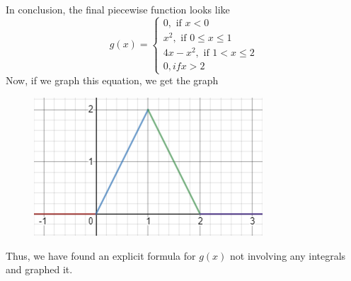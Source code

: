\documentclass{article}
\begin{document}
\begin{enumerate}[label=\textbf{(2.\arabic*)}]
 In conclusion, the final piecewise function looks like
 \[g(x)= \begin{cases}
 0, \text{ if } x<0 \\
 x^2,\text{ if } 0\le x\le1 \\
 4x-x^2,\text{ if }1<x\le2 \\
 0, { if } x>2
 \end{cases} \]
 Now, if we graph this equation, we get the graph
 \begin{figure}[H]
 \centering
 \includegraphics[scale=.5]{fivesies}
 \end{figure}
 Thus, we have found an explicit formula for $g(x)$ not involving any integrals and graphed it.
\end{enumerate}%
\end{document}
